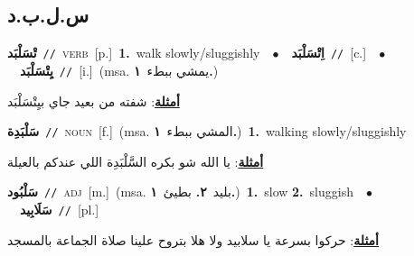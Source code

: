 \documentclass[10pt,a4paper,twoside]{article} %
\begin{document}
\begin{multicols}{2}
\vspace{-3mm}
\subsection*{\color{blue}\foreignlanguage{arabic}{س.ل.ب.د}\color{blue}{}} 

{\setlength\topsep{0pt}\textbf{\foreignlanguage{arabic}{تْسَلْبَد}}\ {\color{gray}\texttt{//}\color{black}}\ \textsc{verb}\ [p.]\ \textbf{1.}~walk slowly/sluggishly\ \ $\bullet$\ \ \setlength\topsep{0pt}\textbf{\foreignlanguage{arabic}{اِتْسَلْبَد}}\ {\color{gray}\texttt{//}\color{black}}\ [c.]\ \ $\bullet$\ \ \setlength\topsep{0pt}\textbf{\foreignlanguage{arabic}{يِتْسَلْبَد}}\ {\color{gray}\texttt{//}\color{black}}\ [i.]\ \color{gray}(msa. \foreignlanguage{arabic}{يمشي ببطء}~\foreignlanguage{arabic}{\textbf{١.}})\color{black}\  \begin{flushright}\color{gray}\foreignlanguage{arabic}{\textbf{\underline{\foreignlanguage{arabic}{أمثلة}}}: شفته من بعيد جاي بيِتْسَلْبَد}\end{flushright}\color{black}} \vspace{2mm}

{\setlength\topsep{0pt}\textbf{\foreignlanguage{arabic}{سَلْبَدِة}}\ {\color{gray}\texttt{//}\color{black}}\ \textsc{noun}\ [f.]\ \color{gray}(msa. \foreignlanguage{arabic}{المشي ببطء}~\foreignlanguage{arabic}{\textbf{١.}})\color{black}\ \textbf{1.}~walking slowly/sluggishly\  \begin{flushright}\color{gray}\foreignlanguage{arabic}{\textbf{\underline{\foreignlanguage{arabic}{أمثلة}}}: يا الله شو بكره السَّلْبَدِة اللي عندكم بالعيلة}\end{flushright}\color{black}} \vspace{2mm}

{\setlength\topsep{0pt}\textbf{\foreignlanguage{arabic}{سَلْبُود}}\ {\color{gray}\texttt{//}\color{black}}\ \textsc{adj}\ [m.]\ \color{gray}(msa. \foreignlanguage{arabic}{بليد}~\foreignlanguage{arabic}{\textbf{٢.}}  \foreignlanguage{arabic}{بطيئ}~\foreignlanguage{arabic}{\textbf{١.}})\color{black}\ \textbf{1.}~slow  \textbf{2.}~sluggish\ \ $\bullet$\ \ \setlength\topsep{0pt}\textbf{\foreignlanguage{arabic}{سَلَابِيد}}\ {\color{gray}\texttt{//}\color{black}}\ [pl.]\  \begin{flushright}\color{gray}\foreignlanguage{arabic}{\textbf{\underline{\foreignlanguage{arabic}{أمثلة}}}: حركوا بسرعة يا سلابيد ولا هلا بتروح علينا صلاة الجماعة بالمسجد}\end{flushright}\color{black}} \vspace{2mm}


\end{multicols}
\end{document}

